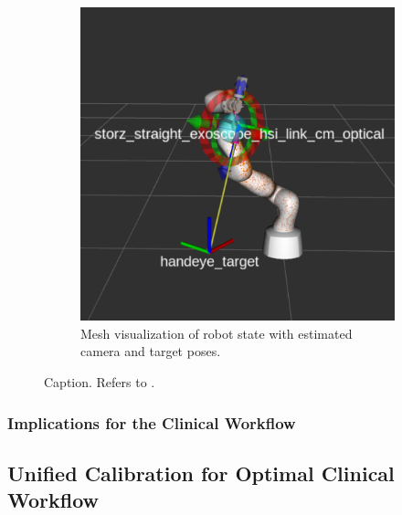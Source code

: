\begin{figure}
\begin{subfigure}[b]{0.49\textwidth}
        \includegraphics[width=\textwidth]{introduction/img/aruco_world.png}
        \caption{Mesh visualization of robot state with estimated camera and target poses.}
    \end{subfigure}
    \caption{Caption. Refers to .}
    \label{fig:enter-label}
\end{figure}



\subsubsection{Implications for the Clinical Workflow}
\label{in:sec:implications_clinical_workflow}


\subsection{Unified Calibration for Optimal Clinical Workflow}
\label{in:sec:unified_calibration}

